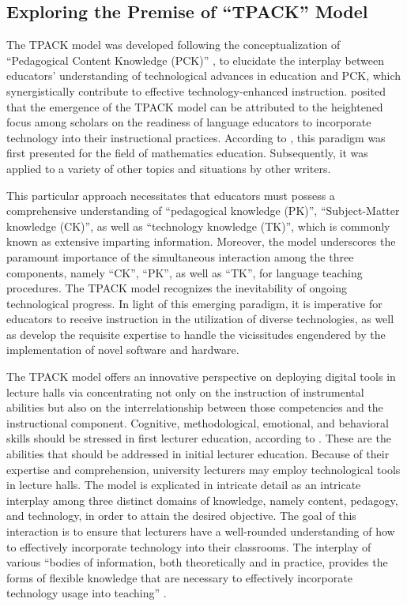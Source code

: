 \documentclass[english]{textolivre}
\begin{document}
\subsection{Exploring the Premise of “TPACK” Model}

The TPACK model was developed following the conceptualization of “Pedagogical Content Knowledge (PCK)” \cite{wittrock_paradigms_1986}, to elucidate the interplay between educators’ understanding of technological advances in education and PCK, which synergistically contribute to effective technology-enhanced instruction. \textcite{lyublinskaya_analysis_2022} posited that the emergence of the TPACK model can be attributed to the heightened focus among scholars on the readiness of language educators to incorporate technology into their instructional practices. According to \textcite{saubern_describing_2020}, this paradigm was first presented for the field of mathematics education. Subsequently, it was applied to a variety of other topics and situations by other writers.

This particular approach necessitates that educators must possess a comprehensive understanding of “pedagogical knowledge (PK)”, “Subject-Matter knowledge (CK)”, as well as “technology knowledge (TK)”, which is commonly known as extensive imparting information. Moreover, the model underscores the paramount importance of the simultaneous interaction among the three components, namely “CK”, “PK”, as well as “TK”, for language teaching procedures. The TPACK model recognizes the inevitability of ongoing technological progress. In light of this emerging paradigm, it is imperative for educators to receive instruction in the utilization of diverse technologies, as well as develop the requisite expertise to handle the vicissitudes engendered by the implementation of novel software and hardware.

The TPACK model offers an innovative perspective on deploying digital tools in lecture halls via concentrating not only on the instruction of instrumental abilities but also on the interrelationship between those competencies and the instructional component. Cognitive, methodological, emotional, and behavioral skills should be stressed in first lecturer education, according to \textcite{vygotskii_mind_1978}. These are the abilities that should be addressed in initial lecturer education. Because of their expertise and comprehension, university lecturers may employ technological tools in lecture halls. The model is explicated in intricate detail as an intricate interplay among three distinct domains of knowledge, namely content, pedagogy, and technology, in order to attain the desired objective. The goal of this interaction is to ensure that lecturers have a well-rounded understanding of how to effectively incorporate technology into their classrooms. The interplay of various “bodies of information, both theoretically and in practice, provides the forms of flexible knowledge that are necessary to effectively incorporate technology usage into teaching” \cite[p. 38]{andriany2022analysis}.
\end{document}
